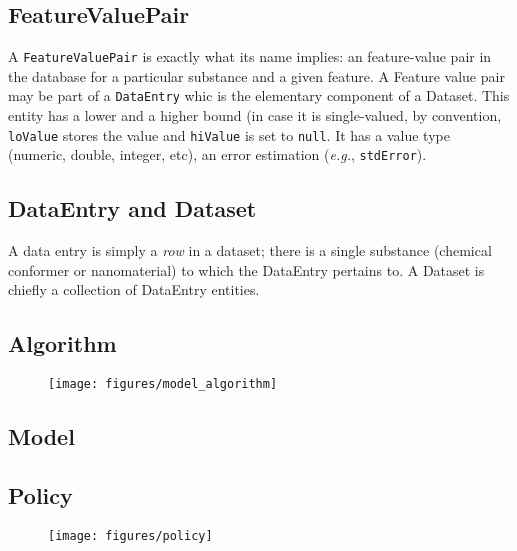 \subsection{FeatureValuePair}
A \texttt{FeatureValuePair} is exactly what its name implies: 
an feature-value pair in the database
for a particular substance and a given feature.
A Feature value pair may be part of a \texttt{DataEntry} whic is 
the elementary component of a Dataset. This entity has a lower
and a higher bound (in case it is single-valued, by convention,
\texttt{loValue} stores the value and \texttt{hiValue} is set to 
\texttt{null}. It has a value type (numeric, double, integer, 
etc), an error estimation (\textit{e.g.}, \texttt{stdError}).


\subsection{DataEntry and Dataset}
A data entry is simply a \textit{row} in a dataset;
there is a single substance (chemical conformer or nanomaterial) to which
the DataEntry pertains to. A Dataset is chiefly a collection of 
DataEntry entities. 



\subsection{Algorithm}
\lipsum[1]

\begin{figure}[h]
 \centering
 \texttt{[image: figures/model\_algorithm]}
\end{figure}

\subsection{Model}
\lipsum[2]

\subsection{Policy}
\lipsum[3]
\begin{figure}[h]
 \centering
 \texttt{[image: figures/policy]}
\end{figure}